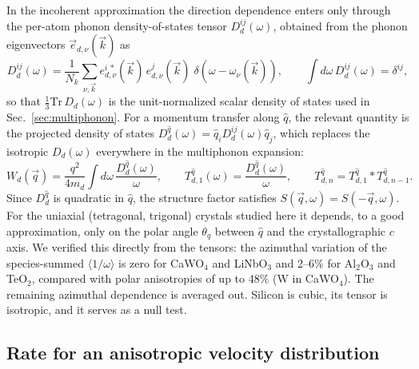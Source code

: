 In the incoherent approximation the direction dependence enters only through the
per-atom phonon density-of-states tensor $D_d^{ij}(\omega)$, obtained from the phonon
eigenvectors $\vec e_{d,\nu}(\vec k)$ as
\begin{equation}
  D_d^{ij}(\omega) = \frac{1}{N_k}\sum_{\nu,\vec k}
  e^{i\,*}_{d,\nu}(\vec k)\, e^{j}_{d,\nu}(\vec k)\;
  \delta\!\left(\omega-\omega_{\nu}(\vec k)\right),
  \qquad
  \int d\omega\, D_d^{ij}(\omega) = \delta^{ij} ,
\end{equation}
so that $\frac13\mathrm{Tr}\,D_d(\omega)$ is the unit-normalized scalar density of states
used in Sec.~\ref{sec:multiphonon}. For a momentum transfer along $\hat q$, the relevant
quantity is the projected density of states
$D_d^{\hat q}(\omega) = \hat q_i D_d^{ij}(\omega)\hat q_j$, which replaces the isotropic
$D_d(\omega)$ everywhere in the multiphonon expansion:
\begin{equation}
  W_d(\vec q) = \frac{q^2}{4 m_d}\int d\omega\,\frac{D_d^{\hat q}(\omega)}{\omega},
  \qquad
  T^{\hat q}_{d,1}(\omega) = \frac{D_d^{\hat q}(\omega)}{\omega},
  \qquad
  T^{\hat q}_{d,n} = T^{\hat q}_{d,1} * T^{\hat q}_{d,n-1} .
\end{equation}
Since $D_d^{\hat q}$ is quadratic in $\hat q$, the structure factor satisfies
$S(\vec q,\omega) = S(-\vec q,\omega)$. For the uniaxial (tetragonal, trigonal) crystals
studied here it depends, to a good approximation, only on the polar angle $\theta_q$
between $\hat q$ and the crystallographic $c$ axis. We verified this directly from the
tensors: the azimuthal variation of the species-summed $\langle 1/\omega\rangle$ is
zero for CaWO$_4$ and LiNbO$_3$ and 2--6\% for Al$_2$O$_3$ and TeO$_2$, compared with
polar anisotropies of up to 48\% (W in CaWO$_4$). The remaining azimuthal dependence is
averaged out. Silicon is cubic, its tensor is isotropic, and it serves as a null test.

\subsection{Rate for an anisotropic velocity distribution}

